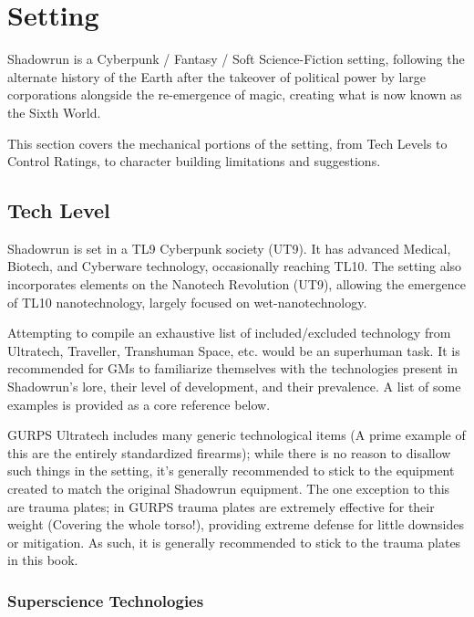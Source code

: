 \section{Setting}

\begin{multicols}{3}
	
	Shadowrun is a Cyberpunk / Fantasy / Soft Science-Fiction setting, following the alternate history of the Earth after the takeover of political power by large corporations alongside the re-emergence of magic, creating what is now known as the Sixth World.
	
	This section covers the mechanical portions of the setting, from Tech Levels to Control Ratings, to character building limitations and suggestions.
	
	\subsection{Tech Level}\label{TL}
	
	Shadowrun is set in a TL9 Cyberpunk society (UT9). It has advanced Medical, Biotech, and Cyberware technology, occasionally reaching TL10. The setting also incorporates elements on the Nanotech Revolution (UT9), allowing the emergence of TL10 nanotechnology, largely focused on wet-nanotechnology.
	
	Attempting to compile an exhaustive list of included/excluded technology from Ultratech, Traveller, Transhuman Space, etc. would be an superhuman task. It is recommended for GMs to familiarize themselves with the technologies present in Shadowrun's lore, their level of development, and their prevalence. A list of some examples is provided as a core reference below.
	
	GURPS Ultratech includes many generic technological items (A prime example of this are the entirely standardized firearms); while there is no reason to disallow such things in the setting, it's generally recommended to stick to the equipment created to match the original Shadowrun equipment. The one exception to this are trauma plates; in GURPS trauma plates are extremely effective for their weight (Covering the whole torso!), providing extreme defense for little downsides or mitigation. As such, it is generally recommended to stick to the trauma plates in this book.
	
	\subsubsection{Superscience Technologies}
	

\end{multicols}
